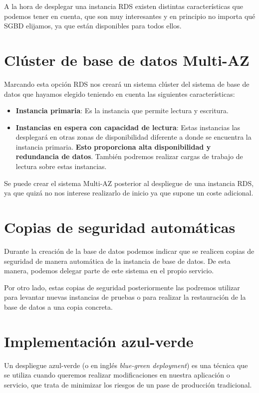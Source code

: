 A la hora de desplegar una instancia RDS existen distintas características que podemos tener en cuenta, que son muy interesantes y en principio no importa qué SGBD elijamos, ya que están disponibles para todos ellos.

\section{Clúster de base de datos Multi-AZ}

Marcando esta opción RDS nos creará un sistema clúster del sistema de base de datos que hayamos elegido teniendo en cuenta las siguientes características:

\begin{itemize}
	\item \textbf{Instancia primaria}: Es la instancia que permite lectura y escritura.
	\item \textbf{Instancias en espera con capacidad de lectura}: Estas instancias las desplegará en otras zonas de disponibilidad diferente a donde se encuentra la instancia primaria. \textbf{Esto proporciona alta disponibilidad y redundancia de datos}. También podremos realizar cargas de trabajo de lectura sobre estas instancias.
\end{itemize}

Se puede crear el sistema Multi-AZ posterior al despliegue de una instancia RDS, ya que quizá no nos interese realizarlo de inicio ya que supone un coste adicional.


\section{Copias de seguridad automáticas}

Durante la creación de la base de datos podemos indicar que se realicen copias de seguridad de manera automática de la instancia de base de datos. De esta manera, podemos delegar parte de este sistema en el propio servicio.

Por otro lado, estas copias de seguridad posteriormente las podremos utilizar para levantar nuevas instancias de pruebas o para realizar la restauración de la base de datos a una copia concreta.


\section{Implementación azul-verde}

Un despliegue azul-verde (o en inglés \textit{blue-green deployment}) es una técnica que se utiliza cuando queremos realizar modificaciones en nuestra aplicación o servicio, que trata de minimizar los riesgos de un pase de producción tradicional.

